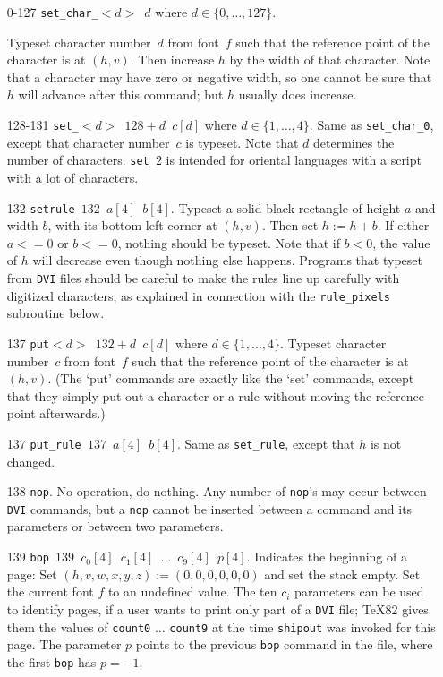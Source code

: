\documentclass{article}
\begin{document}
\begin{itemize}

\item[0-127] \texttt{set\_char\_$<d>$ $d$} where $d\in\{0,\dots,127\}$. 

Typeset character number~$d$ from font~$f$ 
such that the reference point of the character is at $(h,v)$. 
Then increase $h$ by the width of that character. 
Note that a character may have zero or negative width, 
so one cannot be sure that $h$ will advance after this command; 
but $h$ usually does increase.

\item[128-131] \texttt{set\_$<d>$ $128+d$ $c[d]$} where $d\in\{1,\dots,4\}$. 
Same as \texttt{set\_char\_0}, except that character number~$c$ is typeset. 
Note that $d$ determines the number of characters. 
\texttt{set\_$2$} is intended for oriental languages 
with a script with a lot of characters. 


\item[132] \texttt{setrule $132$ $a[4]$ $b[4]$}. 
Typeset a solid black rectangle of height $a$ and width $b$, 
with its bottom left corner at $(h,v)$. 
Then set $h:=h+b$. If either $a<=0$ or $b<=0$, nothing should be typeset. 
Note that if $b<0$, the value of $h$ will decrease 
even though nothing else happens. 
Programs that typeset from \texttt{DVI} files 
should be careful to make the rules line up carefully 
with digitized characters, 
as explained in connection with the \texttt{rule\_pixels} subroutine below.

\item[137] \texttt{put$<d>$ $132+d$ $c[d]$} where $d\in\{1,\dots,4\}$. 
Typeset character number~$c$ from font~$f$
such that the reference point of the character is at $(h,v)$. 
(The `put' commands are exactly like the `set' commands, 
except that they simply put out a character or a rule 
without moving the reference point afterwards.)


\item[137] \texttt{put\_rule $137$ $a[4]$ $b[4]$}. 
Same as \texttt{set\_rule}, except that $h$ is not changed. 

\item[138] \texttt{nop}. 
No operation, do nothing. Any number of \texttt{nop}'s
may occur between \texttt{DVI} commands, 
but a \texttt{nop} cannot be inserted 
between a command and its parameters or between two parameters. 

\item[139] \texttt{bop $139$ $c_0[4]$ $c_1[4]$ $\ldots$ $c_9[4]$ $p[4]$}. 
Indicates the beginning of a page: 
Set $(h,v,w,x,y,z):=(0,0,0,0,0,0)$ and set the stack empty. 
Set the current font $f$ to an undefined value.  
The ten $c_i$ parameters can be used to identify pages, 
if a user wants to print only part of a \texttt{DVI} file; 
\TeX82 gives them the values of \texttt{count0} $\ldots$ \texttt{count9} 
at the time \texttt{shipout} was invoked for this page.  
The parameter $p$ points to the previous \texttt{bop} command in the file, 
where the first \texttt{bop} has $p=-1$.


\end{itemize}
\end{document}
